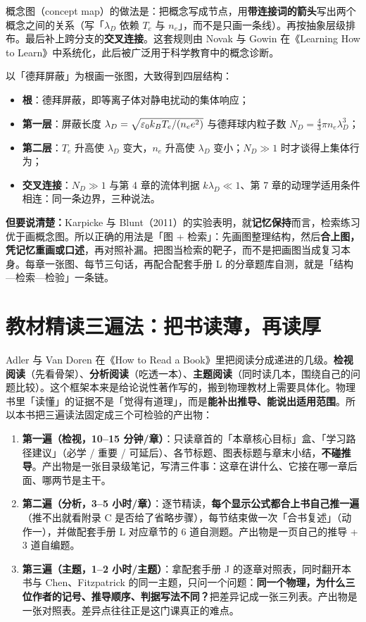 概念图（concept map）的做法是：把概念写成节点，用\textbf{带连接词的箭头}写出两个概念之间的关系（写「$\lambda_D$ 依赖 $T_e$ 与 $n_e$」，而不是只画一条线）。再按抽象层级排布。最后补上跨分支的\textbf{交叉连接}。这套规则由 Novak 与 Gowin 在《Learning How to Learn》中系统化，此后被广泛用于科学教育中的概念诊断。

以「德拜屏蔽」为根画一张图，大致得到四层结构：

\begin{itemize}
\item \textbf{根}：德拜屏蔽，即等离子体对静电扰动的集体响应；
\item \textbf{第一层}：屏蔽长度 $\lambda_D=\sqrt{\varepsilon_0k_BT_e/(n_ee^2)}$ 与德拜球内粒子数 $N_D=\tfrac43\pi n_e\lambda_D^3$；
\item \textbf{第二层}：$T_e$ 升高使 $\lambda_D$ 变大，$n_e$ 升高使 $\lambda_D$ 变小；$N_D\gg1$ 时才谈得上集体行为；
\item \textbf{交叉连接}：$N_D\gg1$ 与第 4 章的流体判据 $k\lambda_D\ll1$、第 7 章的动理学适用条件相连：同一条边界，三种说法。
\end{itemize}

\textbf{但要说清楚：}Karpicke 与 Blunt（2011）的实验表明，就\textbf{记忆保持}而言，检索练习优于画概念图。所以正确的用法是「图 + 检索」：先画图整理结构，然后\textbf{合上图，凭记忆重画或口述}，再对照补漏。把图当检索的靶子，而不是把画图当成复习本身。每章一张图、每节三句话，再配合配套手册 L 的分章题库自测，就是「结构—检索—检验」一条链。


\section{教材精读三遍法：把书读薄，再读厚}

Adler 与 Van Doren 在《How to Read a Book》里把阅读分成递进的几级。\textbf{检视阅读}（先看骨架）、\textbf{分析阅读}（吃透一本）、\textbf{主题阅读}（同时读几本，围绕自己的问题比较）。这个框架本来是给论说性著作写的，搬到物理教材上需要具体化。物理书里「读懂」的证据不是「觉得有道理」，而是\textbf{能补出推导、能说出适用范围}。所以本书把三遍读法固定成三个可检验的产出物：

\begin{enumerate}
\item \textbf{第一遍（检视，10--15 分钟/章）}：只读章首的「本章核心目标」盒、「学习路径建议」（必学 / 重要 / 可延后）、各节标题、图表标题与章末小结，\textbf{不碰推导}。产出物是一张目录级笔记，写清三件事：这章在讲什么、它接在哪一章后面、哪两节是主干。
\item \textbf{第二遍（分析，3--5 小时/章）}：逐节精读，\textbf{每个显示公式都合上书自己推一遍}（推不出就看附录 C 是否给了省略步骤），每节结束做一次「合书复述」（动作一），并做配套手册 L 对应章节的 6 道自测题。产出物是一页自己的推导 + 3 道自编题。
\item \textbf{第三遍（主题，1--2 小时/主题）}：拿配套手册 J 的逐章对照表，同时翻开本书与 Chen、Fitzpatrick 的同一主题，只问一个问题：\textbf{同一个物理，为什么三位作者的记号、推导顺序、判据写法不同？}把差异记成一张三列表。产出物是一张对照表。差异点往往正是这门课真正的难点。
\end{enumerate}

